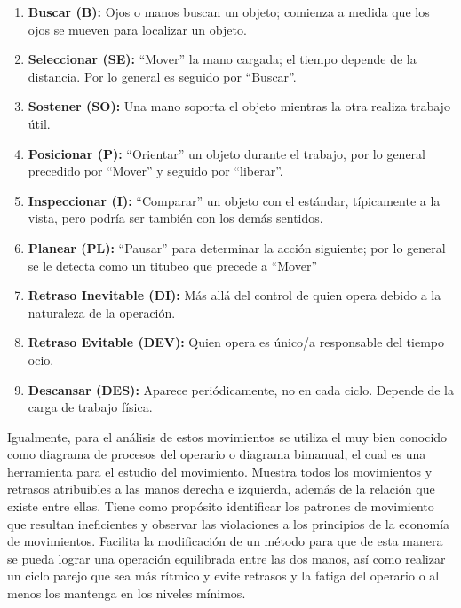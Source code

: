 \begin{enumerate}
        \item \textbf{Buscar (B):} Ojos o manos buscan un objeto; comienza a medida que los ojos se mueven para localizar un objeto.
        \item \textbf{Seleccionar (SE):} “Mover” la mano cargada; el tiempo depende de la distancia. Por lo general es seguido por “Buscar”.
        \item \textbf{Sostener (SO):} Una mano soporta el objeto mientras la otra realiza trabajo útil.
        \item \textbf{Posicionar (P):} “Orientar” un objeto durante el trabajo, por lo general precedido por “Mover” y seguido por “liberar”.
        \item \textbf{Inspeccionar (I):} “Comparar” un objeto con el estándar, típicamente a la vista, pero podría ser también con los demás sentidos.
        \item \textbf{Planear (PL):} “Pausar” para determinar la acción siguiente; por lo general se le detecta como un titubeo que precede a “Mover”
        \item \textbf{Retraso Inevitable (DI):} Más allá del control de quien opera debido a la naturaleza de la operación.
        \item \textbf{Retraso Evitable (DEV):} Quien opera es único/a responsable del tiempo ocio.
        \item \textbf{Descansar (DES):} Aparece periódicamente, no en cada ciclo. Depende de la carga de trabajo física.
    
    \end{enumerate}
    
    
    Igualmente, para el análisis de estos movimientos se utiliza el muy bien conocido como diagrama de procesos del operario o diagrama bimanual, el cual es una herramienta para el estudio del movimiento. Muestra todos los movimientos y retrasos atribuibles a las manos derecha e izquierda, además de la relación que existe entre ellas. 
    Tiene como propósito identificar los patrones de movimiento que resultan ineficientes y observar las violaciones a los principios de la economía de movimientos. Facilita la modificación de un método para que de esta manera se pueda lograr una operación equilibrada entre las dos manos, así como realizar un ciclo parejo que sea más rítmico y evite retrasos y la fatiga del operario o al menos los mantenga en los niveles mínimos.
    
    
